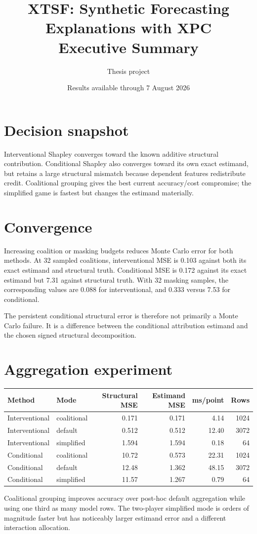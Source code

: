 \documentclass[10pt,a4paper]{article}
\title{\textbf{XTSF: Synthetic Forecasting Explanations with XPC}\\Executive Summary}
\author{Thesis project}
\date{Results available through 7 August 2026}
\begin{document}
\maketitle

\section*{Decision snapshot}
Interventional Shapley converges toward the known additive structural
contribution. Conditional Shapley also converges toward its own exact estimand,
but retains a large structural mismatch because dependent features redistribute
credit. Coalitional grouping gives the best current accuracy/cost compromise;
the simplified game is fastest but changes the estimand materially.

\section{Convergence}
Increasing coalition or masking budgets reduces Monte Carlo error for both
methods. At 32 sampled coalitions, interventional MSE is 0.103 against both its
exact estimand and structural truth. Conditional MSE is 0.172 against its exact
estimand but 7.31 against structural truth. With 32 masking samples, the
corresponding values are 0.088 for interventional, and 0.333 versus 7.53 for
conditional.

The persistent conditional structural error is therefore not primarily a Monte
Carlo failure. It is a difference between the conditional attribution estimand
and the chosen signed structural decomposition.

\section{Aggregation experiment}
\begin{center}
\small
\begin{tabularx}{\linewidth}{@{}llrrrr@{}}
\toprule
Method & Mode & Structural MSE & Estimand MSE & ms/point & Rows \\
\midrule
Interventional & coalitional & 0.171 & 0.171 & 4.14 & 1024 \\
Interventional & default & 0.512 & 0.512 & 12.40 & 3072 \\
Interventional & simplified & 1.594 & 1.594 & 0.18 & 64 \\
Conditional & coalitional & 10.72 & 0.573 & 22.31 & 1024 \\
Conditional & default & 12.48 & 1.362 & 48.15 & 3072 \\
Conditional & simplified & 11.57 & 1.267 & 0.79 & 64 \\
\bottomrule
\end{tabularx}
\end{center}
Coalitional grouping improves accuracy over post-hoc default aggregation while
using one third as many model rows. The two-player simplified mode is orders of
magnitude faster but has noticeably larger estimand error and a different
interaction allocation.
\end{document}
